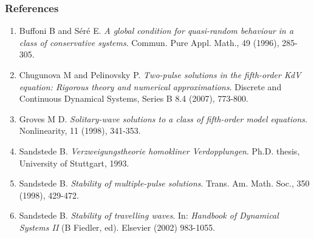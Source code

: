 \documentclass[16pt]{beamer}
\begin{document}
\begin{frame}
	\frametitle{References}
	\fontsize{12}{7.2}\selectfont
	\begin{enumerate}
		\item Buffoni B and S\'er\'e E. \emph{A global condition for quasi-random behaviour in a class of conservative systems}. Commun. Pure Appl. Math., 49 (1996), 285-305.
		\item Chugunova M and Pelinovsky P. \emph{Two-pulse solutions in the fifth-order KdV equation: Rigorous theory and numerical approximations}. Discrete and Continuous Dynamical Systems, Series B 8.4 (2007), 773-800.
		\item Groves M D. \emph{Solitary-wave solutions to a class of fifth-order model equations}. Nonlinearity, 11 (1998), 341-353.
		\item Sandstede B. \emph{Verzweigungstheorie homokliner Verdopplungen}. Ph.D. thesis, University of Stuttgart, 1993.
		\item Sandstede B. \emph{Stability of multiple-pulse solutions}. Trans. Am. Math. Soc., 350 (1998), 429-472.
		\item Sandstede B. \emph{Stability of travelling waves}. In: \emph{Handbook of Dynamical Systems II} (B Fiedler, ed). Elsevier (2002) 983-1055.
	\end{enumerate}
\end{frame}
 
\end{document}
